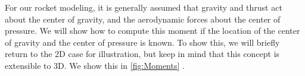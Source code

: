 \documentclass[10pt, openany, titlepage]{book}
\theoremstyle{definition}
\let\oldautoref\autoref
\renewcommand{\autoref}[1]{%
  \begingroup
  \hypersetup{linkcolor=black}%
  \oldautoref{#1}%
  \endgroup
}
\begin{document}
For our rocket modeling, it is generally assumed that gravity and thrust act about the center of gravity, and the aerodynamic forces about the center of pressure. We will show how to compute this moment if the location of the center of gravity and the center of pressure is known. To show this, we will briefly return to the 2D case for illustration, but keep in mind that this concept is extensible to 3D. We show this in \autoref{fig:Moments}.

\begin{figure}[ht]
    \centering


\begin{tikzpicture}[x=0.75pt,y=0.75pt,yscale=-0.95,xscale=0.95]


\end{tikzpicture}
\end{figure}
\end{document}
